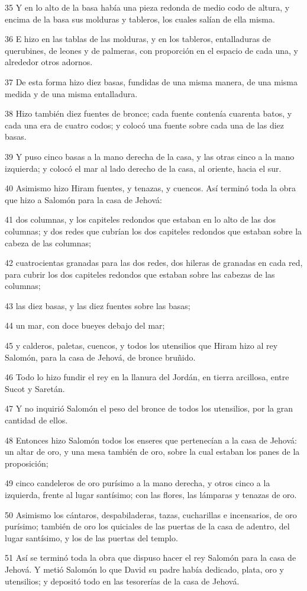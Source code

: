 \par 35 Y en lo alto de la basa había una pieza redonda de medio codo   de altura, y encima de la basa sus molduras y tableros, los cuales salían de ella misma.
\par 36 E hizo en las tablas de las molduras, y en los tableros, entalladuras de querubines, de leones y de palmeras, con proporción en el espacio de cada una, y alrededor otros adornos.
\par 37 De esta forma hizo diez basas, fundidas de una misma manera, de una misma medida y de una misma entalladura.
\par 38 Hizo también diez fuentes de bronce; cada fuente contenía cuarenta batos,  y cada una era de cuatro codos; y colocó una fuente sobre cada una de las diez basas.
\par 39 Y puso cinco basas a la mano derecha de la casa, y las otras cinco a la mano izquierda; y colocó el mar al lado derecho de la casa, al oriente, hacia el sur.
\par 40 Asimismo hizo Hiram fuentes, y tenazas, y cuencos. Así terminó toda la obra que hizo a Salomón para la casa de Jehová:
\par 41 dos columnas, y los capiteles redondos que estaban en lo alto de las dos columnas; y dos redes que cubrían los dos capiteles redondos que estaban sobre la cabeza de las columnas;
\par 42 cuatrocientas granadas para las dos redes, dos hileras de granadas en cada red, para cubrir los dos capiteles redondos que estaban sobre las cabezas de las columnas;
\par 43 las diez basas, y las diez fuentes sobre las basas;
\par 44 un mar, con doce bueyes debajo del mar;
\par 45 y calderos, paletas, cuencos, y todos los utensilios que Hiram hizo al rey Salomón, para la casa de Jehová, de bronce bruñido.
\par 46 Todo lo hizo fundir el rey en la llanura del Jordán, en tierra arcillosa, entre Sucot y Saretán.
\par 47 Y no inquirió Salomón el peso del bronce de todos los utensilios, por la gran cantidad de ellos.
\par 48 Entonces hizo Salomón todos los enseres que pertenecían a la casa de Jehová: un altar de oro, y una mesa también de oro, sobre la cual estaban los panes de la proposición;
\par 49 cinco candeleros de oro purísimo a la mano derecha, y otros cinco a la izquierda, frente al lugar santísimo; con las flores, las lámparas y tenazas de oro.
\par 50 Asimismo los cántaros, despabiladeras, tazas, cucharillas e incensarios, de oro purísimo; también de oro los quiciales de las puertas de la casa de adentro, del lugar santísimo, y los de las puertas del templo.
\par 51 Así se terminó toda la obra que dispuso hacer el rey Salomón para la casa de Jehová. Y metió Salomón lo que David su padre había dedicado,  plata, oro y utensilios; y depositó todo en las tesorerías de la casa de Jehová.

